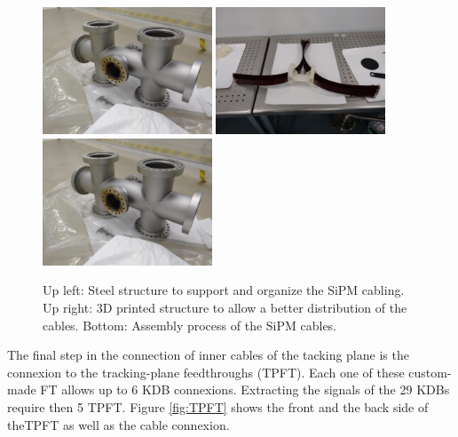 \begin{figure}[hpt!]
\begin{center}
\includegraphics[width=0.45\textwidth]{TrackingPlane/IMG/spaceship_unmounted}
\includegraphics[width=0.45\textwidth]{TrackingPlane/IMG/spacechip_cabling}
\includegraphics[width=0.45\textwidth]{TrackingPlane/IMG/spaceship_unmounted}
\caption{Up left: Steel structure to support and organize the SiPM cabling. Up right: 3D printed structure to allow a better distribution of the cables. Bottom: Assembly process of the SiPM cables.}
\label{fig:cabling_spaceship}
\end{center}
\end{figure}

The final step in the connection of inner cables of the tacking plane is the connexion to the tracking-plane feedthroughs (TPFT). Each one of these custom-made FT allows up to 6 KDB connexions. Extracting the signals of the 29 KDBs require then  5 TPFT. Figure \ref{fig:TPFT} shows the front and the back side of theTPFT as well as the cable connexion.

